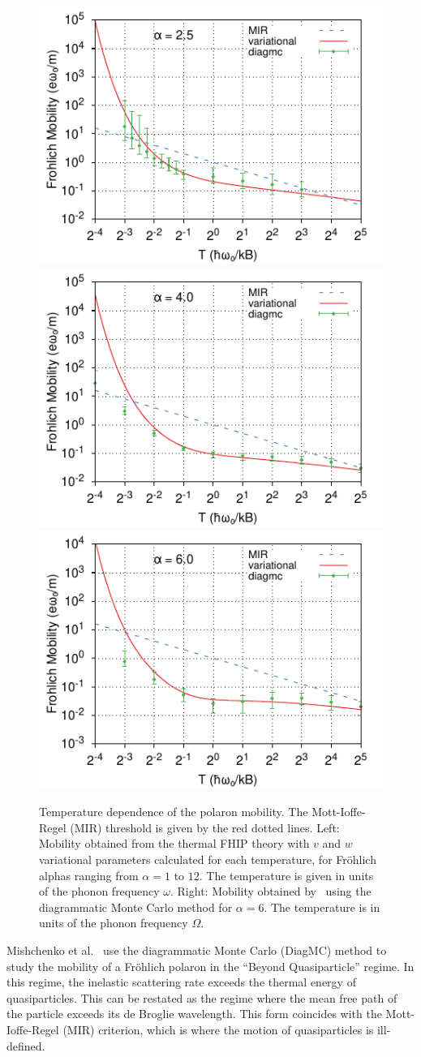 \begin{figure}[t]
    \centering
    \includegraphics[width=.49\textwidth]{figures/frohlich-3d-mobility-alpha-2.5-temp-00625to32-COLOUR.pdf}
    \includegraphics[width=.49\textwidth]{figures/frohlich-3d-mobility-alpha-4-temp-00625to32-COLOUR.pdf}
    \includegraphics[width=.49\textwidth]{figures/frohlich-3d-mobility-alpha-6-temp-00625to32-COLOUR.pdf}
    \caption{Temperature dependence of the polaron mobility. The Mott-Ioffe-Regel (MIR) threshold is given by the red dotted lines. Left: Mobility obtained from the thermal FHIP theory with $v$ and $w$ variational parameters calculated for each temperature, for Fr\"ohlich alphas ranging from $\alpha = 1$ to  $12$. The temperature is given in units of the phonon frequency $\omega$. Right: Mobility obtained by~\cite{mishchenko_polaron_2019} using the diagrammatic Monte Carlo method for $\alpha = 6$. The temperature is in units of the phonon frequency $\Omega$.}
    \label{fig:mishchenko2}
\end{figure}

Mishchenko et al.~\cite{mishchenko_polaron_2019} use the diagrammatic Monte Carlo (DiagMC) method to study the mobility of a Fr\"ohlich polaron in the ``Beyond Quasiparticle'' regime. In this regime, the inelastic scattering rate exceeds the thermal energy of quasiparticles. This can be restated as the regime where the mean free path of the particle exceeds its de Broglie wavelength. This form coincides with the Mott-Ioffe-Regel (MIR) criterion, which is where the motion of quasiparticles is ill-defined. 

